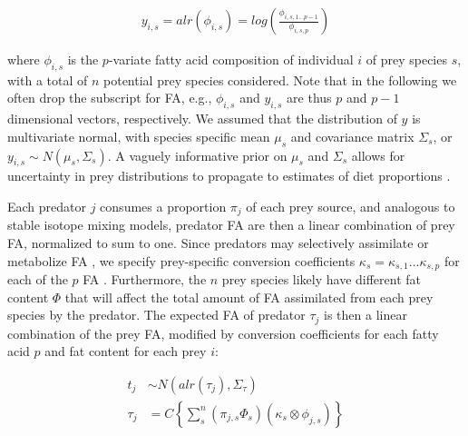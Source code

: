 \documentclass{article}%
\begin{document}
\begin{spacing}{1.9}
\begin{flushleft}
\begin{align}
y_{i,s} = alr(\phi_{i,s}) = log \left( \frac{\phi_{i,s,1...p-1}}{\phi_{i,s,p}} \right)
\end{align}

where $\phi_{i,s}$ is the $p$-variate fatty acid composition of individual
$i$ of prey species $s$, with a total of $n$ potential prey species
considered. Note that in the following we often drop the subscript for
FA, e.g., $\phi_{i,s}$ and $y_{i,s}$ are thus $p$ and $p-1$
dimensional vectors, respectively. We assumed that the distribution of $y$ is
multivariate normal, with species specific mean $\mu_s$ and covariance matrix $\Sigma_s$,
or $y_{i,s} \sim N(\mu_s,\Sigma_s)$. A vaguely informative prior on
$\mu_s$ and $\Sigma_s$ allows for uncertainty in prey distributions to propagate to estimates of diet proportions \citep{ward_including_2010}.

Each predator $j$ consumes a proportion $\pi_j$ of each prey source, and
analogous to stable isotope mixing models, predator FA are then a
linear combination of prey FA, normalized to sum to one. Since predators may selectively assimilate or metabolize FA
\citep{iverson_quantitative_2004,budge_studying_2006,rosen_effects_2012},
we specify prey-specific conversion coefficients $\kappa_{s}
= \kappa_{s,1}...\kappa_{s,p}$ for each of the $p$ FA \citep{rosen_effects_2012}. Furthermore,
the $n$ prey species likely have different fat content $\Phi$
that will affect the total amount of FA assimilated from each
prey species by the
predator. The expected FA of predator $\tau_j$ is then a linear combination of the prey
FA, modified by conversion coefficients for each fatty acid $p$ and fat
content for each prey $i$:

\begin{align}
\label{eq:2}
t_j &\sim N(alr(\tau_{j}),\Sigma_{\tau})\\
\tau_{j} &= C \left\{ \sum_{s}^n  \left(\pi_{j,s} \Phi_{s} \right) \left(
    \kappa_{s} \otimes \phi_{j,s} \right) \right\}
\end{align}


\end{flushleft}
\end{spacing}
\end{document}
